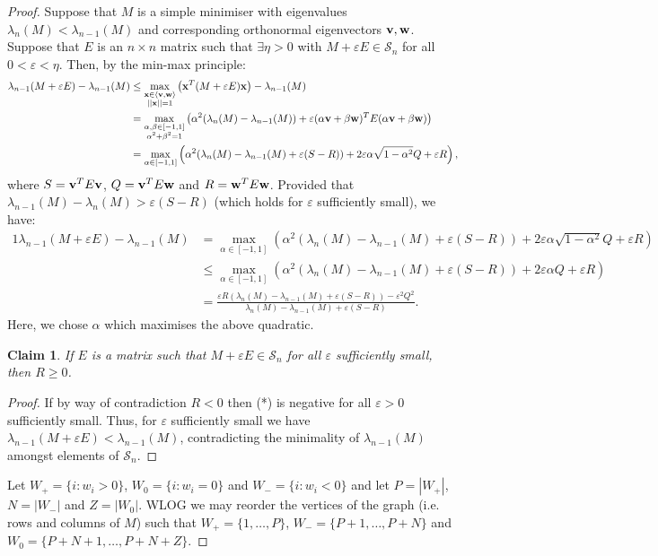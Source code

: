 \documentclass[12pt]{article}
\newtheorem*{claim}{Claim}
\begin{document}
\begin{proof}
    Suppose that $M$ is a simple minimiser with eigenvalues $\lambda_n(M)<\lambda_{n-1}(M)$ and corresponding orthonormal eigenvectors $\bold{v,w}$. Suppose that $E$ is an $n\times n$ matrix such that $\exists \eta>0$ with $M+\varepsilon E \in \mathcal{S}_n$ for all $0<\varepsilon<\eta$. Then, by the min-max principle:
    \begin{alignat*}{1}
        \lambda_{n-1}(M+\varepsilon E) - \lambda_{n-1}(M) & \le \max_{\substack{\bold{x} \in \braket{\bold{v,w}} \\ ||\bold{x}|| = 1}} \left(\bold{x}^{T}(M+\varepsilon E)\bold{x} \right) - \lambda_{n-1}(M) \\
        & = \max_{\substack{\alpha, \beta \in [-1,1]\\ \alpha^2 + \beta^2 = 1}} \left(\alpha^2 (\lambda_{n}(M)-\lambda_{n-1}(M)) + \varepsilon(\alpha\bold{v} + \beta \bold{w})^{T}  E (\alpha\bold{v} + \beta \bold{w})\right)\\ & = \max_{\alpha\in [-1,1]} \left(\alpha^2 (\lambda_n(M)-\lambda_{n-1}(M) + \varepsilon(S-R)) + 2\varepsilon \alpha\sqrt{1-\alpha^2} Q + \varepsilon R\right),
    \end{alignat*}
    where $S = \bold{v}^{T}E\bold{v}$, $Q = \bold{v}^{T}E\bold{w}$ and $R = \bold{w}^{T}E\bold{w}$. Provided that $\lambda_{n-1}(M)-\lambda_{n}(M)>\varepsilon (S-R)$ (which holds for $\varepsilon$ sufficiently small), we have:
    \begin{alignat*}{1}
        \lambda_{n-1}(M+\varepsilon E) - \lambda_{n-1}(M) & = \max_{\alpha\in [-1,1]} \left(\alpha^2 (\lambda_n(M)-\lambda_{n-1}(M) + \varepsilon(S-R)) + 2\varepsilon \alpha\sqrt{1-\alpha^2} Q + \varepsilon R\right)\\ & \le  \max_{\alpha\in [-1,1]} \left(\alpha^2 (\lambda_n(M)-\lambda_{n-1}(M) + \varepsilon(S-R)) + 2\varepsilon \alpha Q + \varepsilon R\right) \\ & = \frac{\varepsilon R(\lambda_{n}(M)-\lambda_{n-1}(M) + \varepsilon(S-R)) - \varepsilon^2 Q^2}{\lambda_n(M)-\lambda_{n-1}(M) + \varepsilon(S-R)}. \tag{*}
    \end{alignat*}
    Here, we chose $\alpha$ which maximises the above quadratic.
    \begin{claim} If $E$ is a matrix such that $M+\varepsilon E \in \mathcal{S}_n$ for all $\varepsilon$ sufficiently small, then $R \ge 0$. 
    \end{claim}
    \begin{proof}
    If by way of contradiction $R < 0$ then (*) is negative for all $\varepsilon > 0$ sufficiently small. Thus, for $\varepsilon$ sufficiently small we have $\lambda_{n-1}(M+\varepsilon E)<\lambda_{n-1}(M)$, contradicting the minimality of $\lambda_{n-1}(M)$ amongst elements of ${\mathcal{S}}_n$. \end{proof}
    Let $W_{+} = \{i:w_i >0\}$, $W_{0} = \{i:w_i =0\}$ and $W_{-} = \{i:w_i<0\}$ and let $P = |W_{+}|$, $N = |W_{-}|$ and $Z = |W_{0}|$. WLOG we may reorder the vertices of the graph (i.e. rows and columns of $M$) such that $W_{+} = \{1,\dots, P\}$, $W_{-} = \{P+1,\dots, P+N\}$ and $W_{0} = \{P+N+1,\dots, P+N+Z\}$. 
    

\end{proof}
\end{document}
